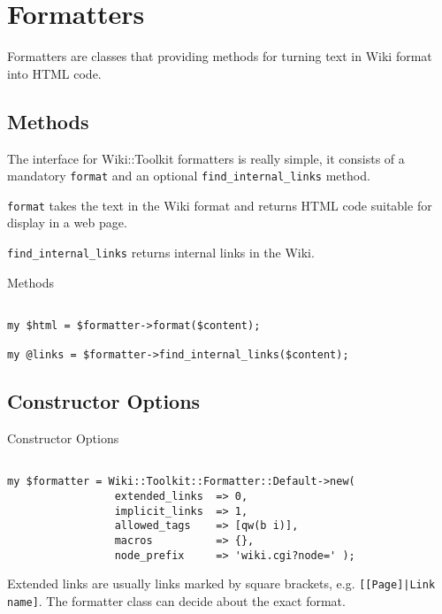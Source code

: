 \section{Formatters}

Formatters are classes that providing methods for turning text in
Wiki format into HTML code.

\subsection{Methods}

The interface for Wiki::Toolkit formatters is really simple, it consists
of a mandatory \verb+format+ and an optional \verb+find_internal_links+
method.

\verb+format+ takes the text in the Wiki format and returns HTML code
suitable for display in a web page.

\verb+find_internal_links+ returns internal links in the Wiki.

\begin{frame}[fragile]{Methods}
\begin{lstlisting}

my $html = $formatter->format($content);

my @links = $formatter->find_internal_links($content);

\end{lstlisting}
\end{frame}

\subsection{Constructor Options}


\begin{frame}[fragile]{Constructor Options}
\begin{lstlisting}

my $formatter = Wiki::Toolkit::Formatter::Default->new(
                 extended_links  => 0,
                 implicit_links  => 1,
                 allowed_tags    => [qw(b i)],
                 macros          => {},
                 node_prefix     => 'wiki.cgi?node=' );

\end{lstlisting}
\end{frame}

Extended links are usually links marked by square brackets, e.g.
\verb+[[Page]|Link name]+. The formatter class can decide about
the exact format.

